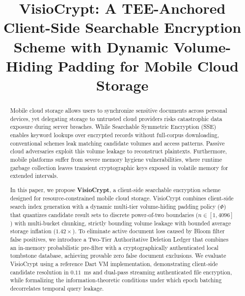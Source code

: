 \documentclass[10pt,conference]{IEEEtran}
\begin{document}
\title{VisioCrypt: A TEE-Anchored Client-Side Searchable Encryption Scheme with Dynamic Volume-Hiding Padding for Mobile Cloud Storage}

\author{
}

\maketitle
\thispagestyle{empty}
\pagestyle{empty}

\begin{abstract}
Mobile cloud storage allows users to synchronize sensitive documents across personal devices, yet delegating storage to untrusted cloud providers risks catastrophic data exposure during server breaches. While Searchable Symmetric Encryption (SSE) enables keyword lookups over encrypted records without full-corpus downloading, conventional schemes leak matching candidate volumes and access patterns. Passive cloud adversaries exploit this volume leakage to reconstruct plaintexts. Furthermore, mobile platforms suffer from severe memory hygiene vulnerabilities, where runtime garbage collection leaves transient cryptographic keys exposed in volatile memory for extended intervals.

In this paper, we propose \textbf{VisioCrypt}, a client-side searchable encryption scheme designed for resource-constrained mobile cloud storage. VisioCrypt combines client-side search index generation with a dynamic multi-tier volume-hiding padding policy ($\Phi$) that quantizes candidate result sets to discrete power-of-two boundaries ($n \in [1, 4096]$) with multi-bucket chunking, strictly bounding volume leakage with bounded average storage inflation ($1.42\times$). To eliminate active document loss caused by Bloom filter false positives, we introduce a Two-Tier Authoritative Deletion Ledger that combines an in-memory probabilistic pre-filter with a cryptographically authenticated local tombstone database, achieving provable zero false document exclusions. We evaluate VisioCrypt using a reference Dart VM implementation, demonstrating client-side candidate resolution in $0.11$~ms and dual-pass streaming authenticated file encryption, while formalizing the information-theoretic conditions under which epoch batching decorrelates temporal query leakage.
\end{abstract}
\end{document}

